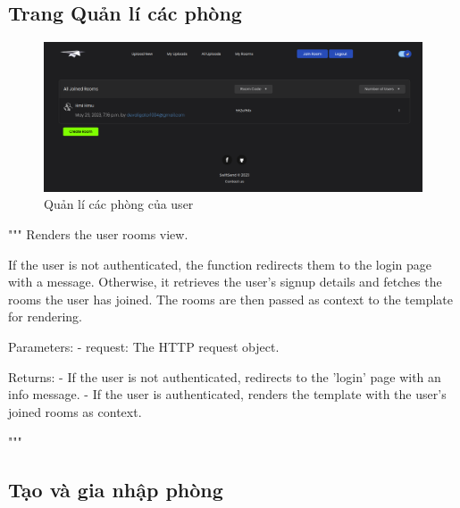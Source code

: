 \documentclass[paper=a4wide, fontsize=12pt]{scrartcl}	 %
\begin{document}
\subsection{Trang Quản lí các phòng}
\begin{figure}[H]
    \centering
    \includegraphics[scale=0.4]{demo/manage_room.png}
    \caption{Quản lí các phòng của user}
\end{figure}

"""
    Renders the user rooms view.

    If the user is not authenticated, the function redirects them to the login page with a message.
    Otherwise, it retrieves the user's signup details and fetches the rooms the user has joined.
    The rooms are then passed as context to the template for rendering.

    Parameters:
    - request: The HTTP request object.

    Returns:
    - If the user is not authenticated, redirects to the 'login' page with an info message.
    - If the user is authenticated, renders the template with the user's joined rooms as context.

    """

\subsection{Tạo và gia nhập phòng}
\end{document}
